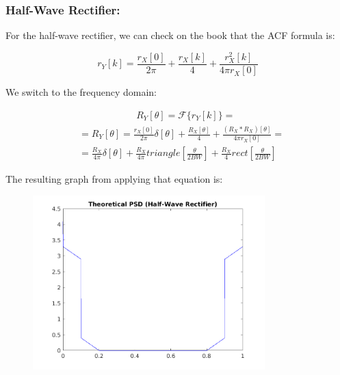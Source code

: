 \documentclass[a4paper,11pt]{article}
\begin{document}
\newpage

\subsubsection{Half-Wave Rectifier:}

For the half-wave rectifier, we can check on the book that the ACF formula is:

\begin{equation}\label{eq:r_hw}
  r_Y[k] = \frac{r_X[0]}{2\pi}
  +\frac{r_X[k]}{4}+\frac{r_X^2[k]}{4\pi r_X[0]}
\end{equation}

We switch to the frequency domain:

\begin{equation}\label{eq:R_hw}
  \begin{split}
  & \qquad\qquad\qquad R_Y[\theta] = \mathcal{F}\{r_Y[k]\} = \\
  & = R_Y[\theta] = \displaystyle\frac{r_X[0]}{2\pi}\delta[\theta] +
  \displaystyle\frac{R_X[\theta]}{4} +
  \frac{(R_X\ast R_X)[\theta]}{4\pi r_X[0]} = \\
  & = \displaystyle\frac{R_X}{4\pi}\delta[\theta] +
  \displaystyle\frac{R_X}{4\pi} triangle[\frac{\theta}{2 BW}] +
  \frac{R_X}{4}rect[\frac{\theta}{2 BW}]
  \end{split}
\end{equation}

The resulting graph from applying that equation is:

\begin{figure}[!hp]
    \begin{center}
      \includegraphics[width=0.8\textwidth]{images/study3/R_th_hw.png}
    \end{center}
\end{figure}
\end{document}
